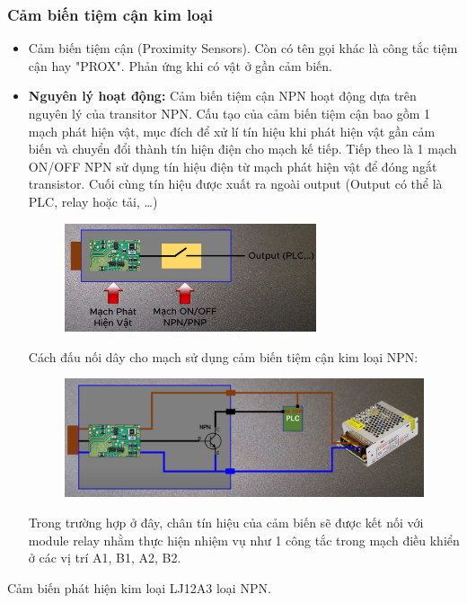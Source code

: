 \subsubsection{Cảm biến tiệm cận kim loại}
\begin{itemize}
    \item Cảm biến tiệm cận (Proximity Sensors). Còn có tên gọi khác là công tắc tiệm cận
    hay "PROX". Phản ứng khi có vật ở gần cảm biến.
    \item \textbf{Nguyên lý hoạt động:} Cảm biến tiệm cận NPN hoạt động dựa trên nguyên lý của 
    transitor NPN. Cấu tạo của cảm biến tiệm cận bao gồm 1 mạch phát hiện vật, mục đích để xử lí tín hiệu
    khi phát hiện vật gần cảm biến và chuyển đổi thành tín hiện điện cho mạch kế tiếp. Tiếp theo là 1 mạch ON/OFF NPN sử dụng tín hiệu
    điện từ mạch phát hiện vật để đóng ngắt transistor. Cuối cùng tín hiệu được xuất ra ngoài output (Output có thể là PLC, relay hoặc tải, \dots)
    \begin{figure}[H]
        \centering
        \includegraphics[width=0.7\textwidth]{pictures/structure_sensor.png}
    \end{figure}
    Cách đấu nối dây cho mạch sử dụng cảm biến tiệm cận kim loại NPN:
    \begin{figure}[H]
        \centering
        \includegraphics[width=1\textwidth]{pictures/mach_sensor.png}
    \end{figure}
    Trong trường hợp ở đây, chân tín hiệu của cảm biến sẽ được kết nối với module relay nhằm thực hiện nhiệm vụ như 1 công tắc trong mạch điều khiển
    ở các vị trí A1, B1, A2, B2.
\end{itemize}
Cảm biến phát hiện kim loại LJ12A3 loại NPN. 
